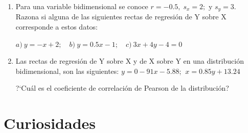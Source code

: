 \begin{adjustwidth}{20pt}{10pt}
\begin{enumerate}[PB. 1. ]
\hspace{-1cm}\vspace{1cm}



\item Para una variable bidimensional se conoce $r = -0.5,\;  s_x = 2; \text{ y } s_y = 3$. Razona si alguna de las siguientes rectas de regresión de Y sobre X corresponde a estos datos:

$a)\ y=-x +2;\quad  b)\ y=0.5x-1; \quad  c)\ 3x+4y-4=0$

 
\hspace{-1cm}\vspace{1cm}




\item  Las rectas de regresión de Y sobre X y de X sobre Y en una distribución bidimensional, son las siguientes:
$y = 0-91x - 5.88$;  $\ x = 0.85y + 13.24$

?`Cuál es el coeficiente de correlación de Pearson de la distribución? 
 
\hspace{-1cm}\vspace{1cm}



\end{enumerate}
\end{adjustwidth}



\section{Curiosidades}

